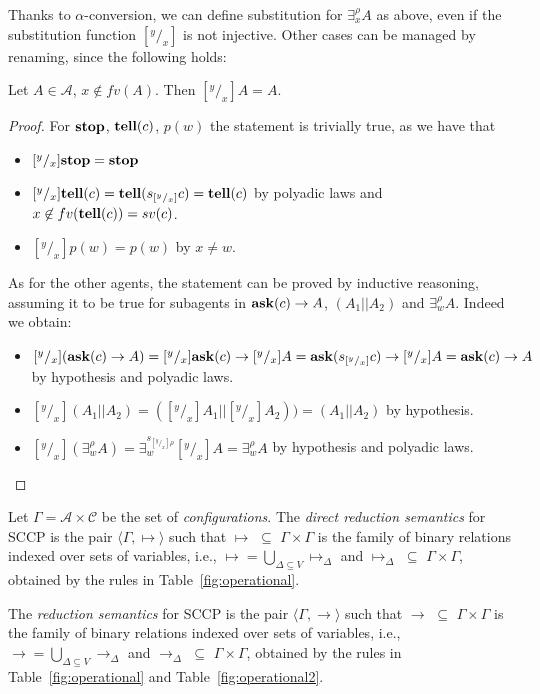 \documentclass{llncs}
\def\C{{\mathcal C}}
\newcommand{\tell}{{\bf tell}}
\newcommand{\ask}{{\bf ask}}
\newcommand{\ostop}{{\bf stop}}
\newcommand{\rarrow}{\rightarrow}
\def\C{{\mathcal C}}
\begin{document}
Thanks to $\alpha$-conversion, we can define substitution for $\exists^{\rho}_x A$ as above, even if the substitution function $[^y/_x]$ is not injective. Other cases can be managed by renaming, since the following holds:

\begin{proposition}
Let $A \in \mathcal{A}$, $x \not \in fv(A)$. Then $[^y/_x]A = A$.
\end{proposition}

\begin{proof}
For $\ostop$, $\tell(c)$, $p(w)$ the statement is trivially true, as we have that
\begin{itemize}
	\item $[^y/_x]\ostop = \ostop$
	\item $[^y/_x]\tell(c) = \tell(s_{[^y/_x]}c) = \tell(c)$ by polyadic laws and $x \not
	\in fv(\tell(c)) = sv(c)$.
	\item $[^y/_x]p(w) = p(w)$ by $x \not = w$.
\end{itemize}
As for the other agents, the statement can be proved by inductive reasoning, assuming it to be true for subagents in $\ask(c) \rightarrow A$, $(A_1 || A_2)$ and $\exists^{\rho}_w A$. Indeed we obtain:
\begin{itemize}
	\item $[^y/_x](\ask(c) \rightarrow A) = [^y/_x]\ask(c) \rightarrow [^y/_x]A = 
	\ask(s_{[^y/_x]}c) \rightarrow [^y/_x]A = \ask(c) \rightarrow A$
	by hypothesis and polyadic laws.
	\item $[^y/_x](A_1 || A_2) = ([^y/_x]A_1 || [^y/_x]A_2)) = (A_1 || A_2)$
	by hypothesis.
	\item $[^y/_x](\exists^{\rho}_w A) = \exists^{s_{[^y/_x]\rho}}_w [^y/_x]A = \exists^{\rho}_w A$
	by hypothesis and polyadic laws.
\end{itemize}
\end{proof}

\begin{definition}[Reductions]\label{def:reductions}
Let $\Gamma = {\mathcal A} \times \C$ be the set of \emph{configurations}.
The \emph{direct reduction semantics} for SCCP is the pair 
$\langle \Gamma,  \mapsto \rangle$
such that $\mapsto \, \, \subseteq \, \,\Gamma \times   \Gamma$ is the family 
 of binary relations indexed over sets of variables,
i.e., $\mapsto = \bigcup_{\Delta \subseteq V} \mapsto_\Delta$ and 
$\mapsto_\Delta \, \, \subseteq \, \,\Gamma \times \Gamma$, obtained by the rules in 
Table~\ref{fig:operational}.

The \emph{reduction semantics} for SCCP is the pair 
$\langle \Gamma,  \rightarrow \rangle$
such that $\rightarrow \, \, \subseteq \, \,\Gamma \times   \Gamma$ is the family 
 of binary relations indexed over sets of variables,
i.e., $\rightarrow = \bigcup_{\Delta \subseteq V} \rarrow_\Delta$ and 
$\rarrow_\Delta \, \, \subseteq \, \,\Gamma \times \Gamma$, obtained by the rules in 
Table~\ref{fig:operational} and Table~\ref{fig:operational2}.
\end{definition}
\end{document}
